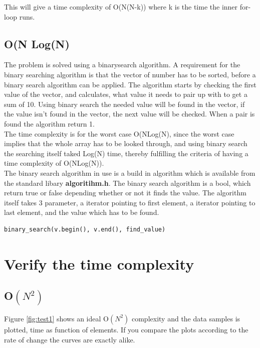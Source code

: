 This will give a time complexity of O(N(N-k)) where k is the time the inner for-loop runs.
\subsection{O(N Log(N)}
The problem is solved using a binarysearch algorithm. A requirement for the binary searching algorithm is that the vector of number has to be sorted, before a binary search algorithm can be applied. 
The algorithm starts by checking the first value of the vector, and calculates, what value it needs to pair up with to get a sum of 10.  Using binary search the needed value will be found in the vector, if the value isn't found in the vector, the next value will be checked.  When a pair is found the algorithm return 1. 
\\

The time complexity is for the worst case O(NLog(N), since the worst case implies that the whole array has to be looked through, and using binary search the  searching itself taked Log(N) time, thereby fulfilling the criteria of having a time complexity of O(NLog(N)).    
\\

The binary search algorithm in use is a build in algorithm which is available from the standard libary \textbf{algoritihm.h}. The binary search algorithm is a bool, which return true or false depending whether or not it finds the value.  The algorithm itself takes 3 parameter, 	a iterator pointing to first element, a iterator pointing to last element, and the value which has to be found. 
\begin{lstlisting}
binary_search(v.begin(), v.end(), find_value)
\end{lstlisting}


\newpage
\section{Verify the time complexity}


\subsection{O\(\left( { N }^{ 2 } \right)\)}
Figure \ref{fig:test1} shows an ideal O\(\left( { N }^{ 2 } \right)\) complexity and the data samples is plotted, time as function of elements. If you compare the plots according to the rate of change the curves are exactly alike. 



